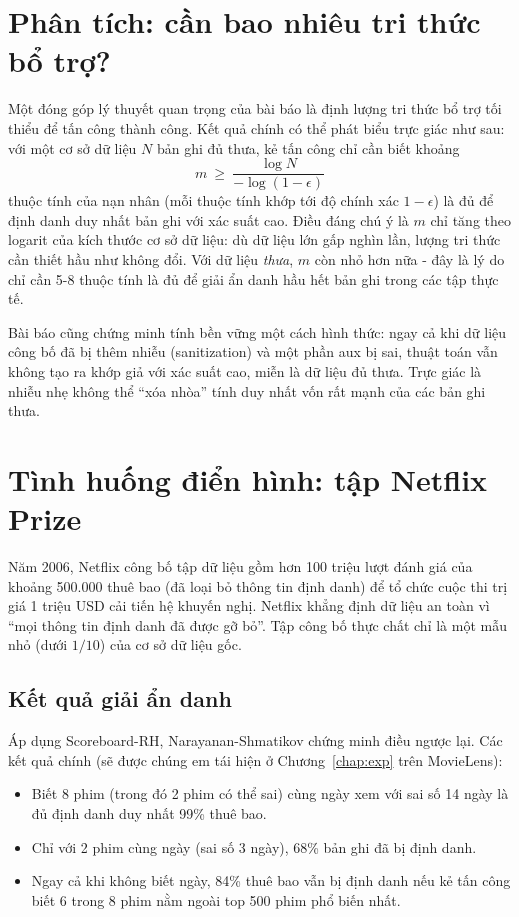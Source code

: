 \section{Phân tích: cần bao nhiêu tri thức bổ trợ?}

Một đóng góp lý thuyết quan trọng của bài báo là định lượng tri thức bổ trợ tối thiểu để tấn công thành công. Kết quả chính có thể phát biểu trực giác như sau: với một cơ sở dữ liệu $N$ bản ghi đủ thưa, kẻ tấn công chỉ cần biết khoảng
\begin{equation}
	m \ \ge\ \frac{\log N}{-\log(1 - \epsilon)}
\end{equation}
thuộc tính của nạn nhân (mỗi thuộc tính khớp tới độ chính xác $1-\epsilon$) là đủ để định danh duy nhất bản ghi với xác suất cao. Điều đáng chú ý là $m$ chỉ tăng theo logarit của kích thước cơ sở dữ liệu: dù dữ liệu lớn gấp nghìn lần, lượng tri thức cần thiết hầu như không đổi. Với dữ liệu \textit{thưa}, $m$ còn nhỏ hơn nữa - đây là lý do chỉ cần 5-8 thuộc tính là đủ để giải ẩn danh hầu hết bản ghi trong các tập thực tế.

Bài báo cũng chứng minh tính bền vững một cách hình thức: ngay cả khi dữ liệu công bố đã bị thêm nhiễu (sanitization) và một phần aux bị sai, thuật toán vẫn không tạo ra khớp giả với xác suất cao, miễn là dữ liệu đủ thưa. Trực giác là nhiễu nhẹ không thể ``xóa nhòa'' tính duy nhất vốn rất mạnh của các bản ghi thưa.

\section{Tình huống điển hình: tập Netflix Prize}

Năm 2006, Netflix công bố tập dữ liệu gồm hơn 100 triệu lượt đánh giá của khoảng 500.000 thuê bao (đã loại bỏ thông tin định danh) để tổ chức cuộc thi trị giá 1 triệu USD cải tiến hệ khuyến nghị. Netflix khẳng định dữ liệu an toàn vì ``mọi thông tin định danh đã được gỡ bỏ''. Tập công bố thực chất chỉ là một mẫu nhỏ (dưới $1/10$) của cơ sở dữ liệu gốc.

\subsection{Kết quả giải ẩn danh}
Áp dụng Scoreboard-RH, Narayanan-Shmatikov chứng minh điều ngược lại. Các kết quả chính (sẽ được chúng em tái hiện ở Chương~\ref{chap:exp} trên MovieLens):
\renewcommand{\labelitemi}{$-$}
\begin{itemize}
	\item Biết 8 phim (trong đó 2 phim có thể sai) cùng ngày xem với sai số 14 ngày là đủ định danh duy nhất 99\% thuê bao.
	\item Chỉ với 2 phim cùng ngày (sai số 3 ngày), 68\% bản ghi đã bị định danh.
	\item Ngay cả khi không biết ngày, 84\% thuê bao vẫn bị định danh nếu kẻ tấn công biết 6 trong 8 phim nằm ngoài top 500 phim phổ biến nhất.
\end{itemize}

